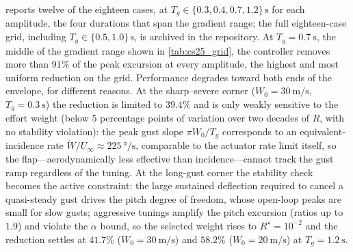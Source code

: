  reports twelve of the eighteen cases, at $T_g\in\{0.3,0.4,0.7,1.2\}\,\si{\second}$
for each amplitude, the four durations that span the gradient range; the full eighteen-case
grid, including $T_g\in\{0.5,1.0\}\,\si{\second}$, is archived in the repository. At
$T_g = \SI{0.7}{\second}$, the middle of the gradient range shown in \cref{tab:cs25_grid}, the
controller removes more than $91\%$ of the peak excursion at every amplitude, the highest and
most uniform reduction on the grid. Performance degrades toward both
ends of the envelope, for different reasons. At the sharp--severe corner
($W_0 = \SI{30}{\meter\per\second}$, $T_g = \SI{0.3}{\second}$) the reduction is limited to $39.4\%$ and is
only weakly sensitive to the effort weight (below $5$ percentage points of
variation over two decades of $R$, with no stability violation): the peak
gust slope $\pi W_0/T_g$ corresponds to an equivalent-incidence rate
$\dot{W}/U_\infty \approx \SI{225}{\degree\per\second}$, comparable to the actuator rate
limit itself, so the flap---aerodynamically less effective than
incidence---cannot track the gust ramp regardless of the tuning. At the
long-gust corner the stability check becomes the active constraint: the
large sustained deflection required to cancel a quasi-steady gust drives the
pitch degree of freedom, whose open-loop peaks are small for slow gusts;
aggressive tunings amplify the pitch excursion (ratios up to $1.9$) and
violate the $\dot\alpha$ bound, so the selected weight rises to
$R^{\star} = 10^{-2}$ and the reduction settles at $41.7\%$
($W_0 = \SI{30}{\meter\per\second}$) and $58.2\%$ ($W_0 = \SI{20}{\meter\per\second}$) at $T_g = \SI{1.2}{\second}$.

